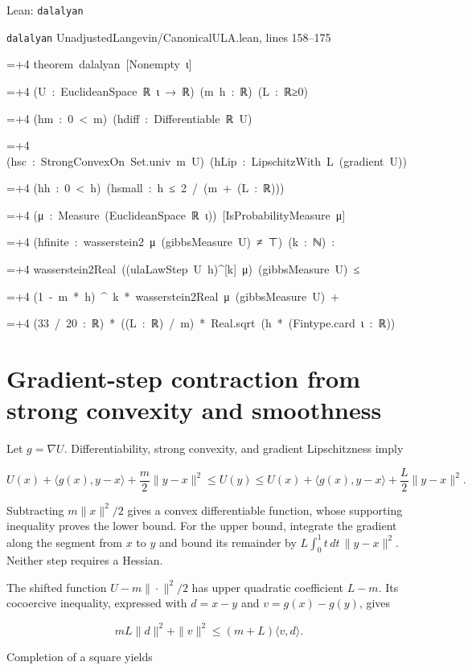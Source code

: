 \documentclass[11pt,a4paper]{article}
\newlength{\leancharwidth}
\newenvironment{leancode}{\par\smallskip\begingroup\ttfamily\footnotesize\raggedright
  \settowidth{\leancharwidth}{M}\setlength{\parskip}{0pt}\setlength{\parindent}{0pt}
  \frenchspacing}{\par\endgroup\smallskip}
\newcommand{\leanline}[2]{\hangindent=\dimexpr#1\leancharwidth+4\leancharwidth\relax
  \hangafter=1\noindent\hspace*{#1\leancharwidth}#2\par}
\newcommand{\leansource}[1]{\par{\footnotesize\color{leanmuted}#1}\par}
\begin{document}
\begin{leanbox}{Lean: \texttt{dalalyan}}
\leansource{\texttt{dalalyan} \quad UnadjustedLangevin/\allowbreak{}CanonicalULA.lean, lines 158–175}
\begin{leancode}
\leanline{0}{theorem\ dalalyan\ [Nonempty\ ι]}
\leanline{4}{(U\ :\ EuclideanSpace\ ℝ\ ι\ →\ ℝ)\ (m\ h\ :\ ℝ)\ (L\ :\ ℝ≥0)}
\leanline{4}{(hm\ :\ 0\ <\ m)\ (hdiff\ :\ Differentiable\ ℝ\ U)}
\leanline{4}{(hsc\ :\ StrongConvexOn\ Set.univ\ m\ U)\ (hLip\ :\ LipschitzWith\ L\ (gradient\ U))}
\leanline{4}{(hh\ :\ 0\ <\ h)\ (hsmall\ :\ h\ ≤\ 2\ /\ (m\ +\ (L\ :\ ℝ)))}
\leanline{4}{(μ\ :\ Measure\ (EuclideanSpace\ ℝ\ ι))\ [IsProbabilityMeasure\ μ]}
\leanline{4}{(hfinite\ :\ wasserstein2\ μ\ (gibbsMeasure\ U)\ ≠\ ⊤)\ (k\ :\ ℕ)\ :}
\leanline{4}{wasserstein2Real\ ((ulaLawStep\ U\ h)\textasciicircum{}[k]\ μ)\ (gibbsMeasure\ U)\ ≤}
\leanline{6}{(1\ -\ m\ *\ h)\ \textasciicircum{}\ k\ *\ wasserstein2Real\ μ\ (gibbsMeasure\ U)\ +}
\leanline{8}{(33\ /\ 20\ :\ ℝ)\ *\ ((L\ :\ ℝ)\ /\ m)\ *\ Real.sqrt\ (h\ *\ (Fintype.card\ ι\ :\ ℝ))}
\end{leancode}
\end{leanbox}

\section{\texorpdfstring{Gradient-step contraction from strong convexity and smoothness}{Gradient-step contraction from strong convexity and smoothness}}



Let \(g=\nabla U\). Differentiability, strong convexity, and gradient Lipschitzness imply

\[U(x)+\langle g(x),y-x\rangle+\frac m2\|y-x\|^2
\le U(y)\le U(x)+\langle g(x),y-x\rangle+\frac L2\|y-x\|^2.\]

Subtracting \(m\|x\|^2/2\) gives a convex differentiable function, whose supporting inequality proves the lower bound. For the upper bound, integrate the gradient along the segment from \(x\) to \(y\) and bound its remainder by \(L\int_0^1t\,dt\,\|y-x\|^2\). Neither step requires a Hessian.



The shifted function \(U-m\|\cdot\|^2/2\) has upper quadratic coefficient \(L-m\). Its cocoercive inequality, expressed with \(d=x-y\) and \(v=g(x)-g(y)\), gives

\[mL\|d\|^2+\|v\|^2\le(m+L)\langle v,d\rangle.\]

Completion of a square yields
\end{document}
